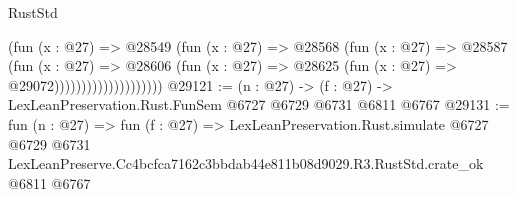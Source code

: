 \begin{lexlean}{RustStd}
\begin{coremodule}
                                (fun (x : @27) =>
                                @28549
                                  (fun (x : @27) =>
                                  @28568
                                    (fun (x : @27) =>
                                    @28587
                                      (fun (x : @27) =>
                                      @28606
                                        (fun (x : @27) =>
                                        @28625 (fun (x : @27) => @29072))))))))))))))))))))
@29121 := (n : @27) -> (f : @27) -> LexLeanPreservation.Rust.FunSem @6727 @6729 @6731 @6811 @6767
@29131 := fun (n : @27) =>
  fun (f : @27) =>
  LexLeanPreservation.Rust.simulate
    @6727
    @6729
    @6731
    LexLeanPreserve.Cc4bcfca7162c3bbdab44e811b08d9029.R3.RustStd.crate_ok
    @6811
    @6767
\end{coremodule}
\end{lexlean}
